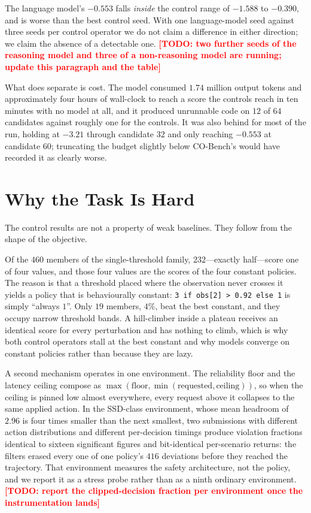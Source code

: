 \documentclass[conference]{IEEEtran}
\newcommand{\TODO}[1]{\textcolor{red}{\textbf{[TODO: #1]}}}
\begin{document}
The language model's $-0.553$ falls \emph{inside} the control range of $-1.588$ to
$-0.390$, and is worse than the best control seed. With one language-model seed against
three seeds per control operator we do not claim a difference in either direction; we
claim the absence of a detectable one. \TODO{two further seeds of the reasoning model and
three of a non-reasoning model are running; update this paragraph and the table}

What does separate is cost. The model consumed $1.74$ million output tokens and
approximately four hours of wall-clock to reach a score the controls reach in ten minutes
with no model at all, and it produced unrunnable code on $12$ of $64$ candidates against
roughly one for the controls. It was also behind for most of the run, holding at $-3.21$
through candidate $32$ and only reaching $-0.553$ at candidate $60$; truncating the budget
slightly below CO-Bench's would have recorded it as clearly worse.

\section{Why the Task Is Hard}
\label{sec:saturation}

The control results are not a property of weak baselines. They follow from the shape of
the objective.

Of the $460$ members of the single-threshold family, $232$---exactly half---score one of
four values, and those four values are the scores of the four constant policies. The
reason is that a threshold placed where the observation never crosses it yields a policy
that is behaviourally constant: \texttt{3 if obs[2] > 0.92 else 1} is simply ``always
$1$''. Only $19$ members, $4\%$, beat the best constant, and they occupy narrow threshold
bands. A hill-climber inside a plateau receives an identical score for every perturbation
and has nothing to climb, which is why both control operators stall at the best constant
and why models converge on constant policies rather than because they are lazy.

A second mechanism operates in one environment. The reliability floor and the latency
ceiling compose as $\max(\text{floor}, \min(\text{requested}, \text{ceiling}))$, so when
the ceiling is pinned low almost everywhere, every request above it collapses to the same
applied action. In the SSD-class environment, whose mean headroom of $2.96$ is four times
smaller than the next smallest, two submissions with different action distributions and
different per-decision timings produce violation fractions identical to sixteen
significant figures and bit-identical per-scenario returns: the filters erased every one of
one policy's $416$ deviations before they reached the trajectory. That environment measures
the safety architecture, not the policy, and we report it as a stress probe rather than as
a ninth ordinary environment. \TODO{report the clipped-decision fraction per environment
once the instrumentation lands}
\end{document}
